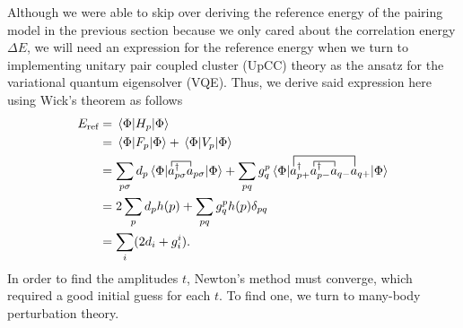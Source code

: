 \documentclass[Dual]{msu-thesis}
\begin{document}
Although we were able to skip over deriving the reference energy of the pairing model in the previous section because we only cared about the correlation energy $\Delta E$, we will need an expression for the reference energy when we turn to implementing unitary pair coupled cluster (UpCC) theory as the ansatz for the variational quantum eigensolver (VQE). Thus, we derive said expression here using Wick's theorem as follows
\begin{align}
E_{\text{ref}}
&=
\mel{\Phi}{H_p}{\Phi}
\nonumber
\\
&=
\mel*{\Phi}{F_p}{\Phi}
+
\mel{\Phi}{V_p}{\Phi}
\nonumber
\\
&=
\sum_{p\sigma}d_p\mel{\Phi}{
\contraction{}{a}{^\dagger_{p\sigma}}{a}
{a^\dagger_{p\sigma}a_{p\sigma}}
}{\Phi}
+
\sum_{pq}g_q^p\mel{\Phi}{
\contraction[1ex]{a^\dagger_{p+}}{a}{^\dagger_{p-}}{a}
\contraction[2ex]{}{a}{^\dagger_{p+}a^\dagger_{p-}a_{q-}}{a}
a^\dagger_{p+}a^\dagger_{p-}a_{q-}a_{q+}
}{\Phi}
\nonumber
\\
&=
2\sum_pd_ph(p)+\sum_{pq}g_q^ph(p)\delta_{pq}
\nonumber
\\
&=
\sum_i(2d_i+g_i^i)
.\end{align}
In order to find the amplitudes $t$, Newton's method must converge, which required a good initial guess for each $t$. To find one, we turn to many-body perturbation theory.
\end{document}
